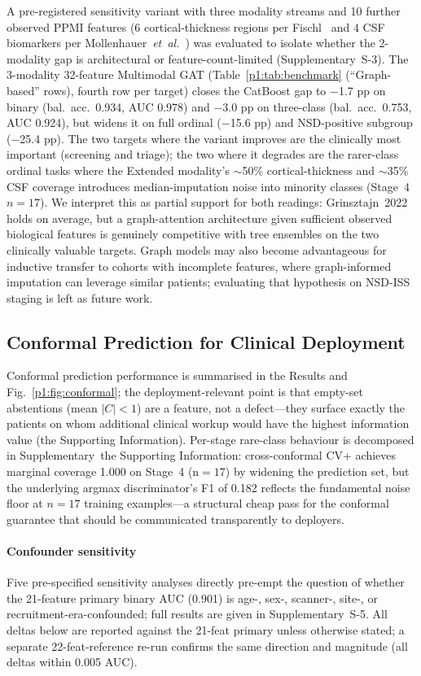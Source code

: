 \documentclass[10pt,letterpaper]{article}
\begin{document}
A pre-registered sensitivity variant with three modality streams and 10 further observed PPMI features (6 cortical-thickness regions per Fischl~\cite{fischl2012} and 4 CSF biomarkers per Mollenhauer~\textit{et~al.}~\cite{mollenhauer2017}) was evaluated to isolate whether the 2-modality gap is architectural or feature-count-limited (Supplementary~S-3). The 3-modality 32-feature Multimodal GAT (Table~\ref{p1:tab:benchmark} (``Graph-based'' rows), fourth row per target) closes the CatBoost gap to $-$1.7 pp on binary (bal.\ acc.\ 0.934, AUC 0.978) and $-$3.0 pp on three-class (bal.\ acc.\ 0.753, AUC 0.924), but widens it on full ordinal ($-$15.6 pp) and NSD-positive subgroup ($-$25.4 pp). The two targets where the variant improves are the clinically most important (screening and triage); the two where it degrades are the rarer-class ordinal tasks where the Extended modality's $\sim$50\% cortical-thickness and $\sim$35\% CSF coverage introduces median-imputation noise into minority classes (Stage~4 $n{=}17$). We interpret this as partial support for both readings: Grinsztajn~2022 holds on average, but a graph-attention architecture given sufficient observed biological features is genuinely competitive with tree ensembles on the two clinically valuable targets. Graph models may also become advantageous for inductive transfer to cohorts with incomplete features, where graph-informed imputation can leverage similar patients; evaluating that hypothesis on NSD-ISS staging is left as future work.

\subsection*{Conformal Prediction for Clinical Deployment}
Conformal prediction performance is summarised in the Results and Fig.~\ref{p1:fig:conformal}; the deployment-relevant point is that empty-set abstentions (mean $|C|<1$) are a feature, not a defect---they surface exactly the patients on whom additional clinical workup would have the highest information value (the Supporting Information). Per-stage rare-class behaviour is decomposed in Supplementary~the Supporting Information: cross-conformal CV+ achieves marginal coverage 1.000 on Stage~4 (n${=}17$) by widening the prediction set, but the underlying argmax discriminator's F1 of 0.182 reflects the fundamental noise floor at $n{=}17$ training examples---a structural cheap pass for the conformal guarantee that should be communicated transparently to deployers.

\paragraph*{Confounder sensitivity}
\label{p1:sec:discussion:confounders}
Five pre-specified sensitivity analyses directly pre-empt the question of whether the 21-feature primary binary AUC (0.901) is age-, sex-, scanner-, site-, or recruitment-era-confounded; full results are given in Supplementary~S-5. All deltas below are reported against the 21-feat primary unless otherwise stated; a separate 22-feat-reference re-run confirms the same direction and magnitude (all deltas within 0.005 AUC).
\end{document}
